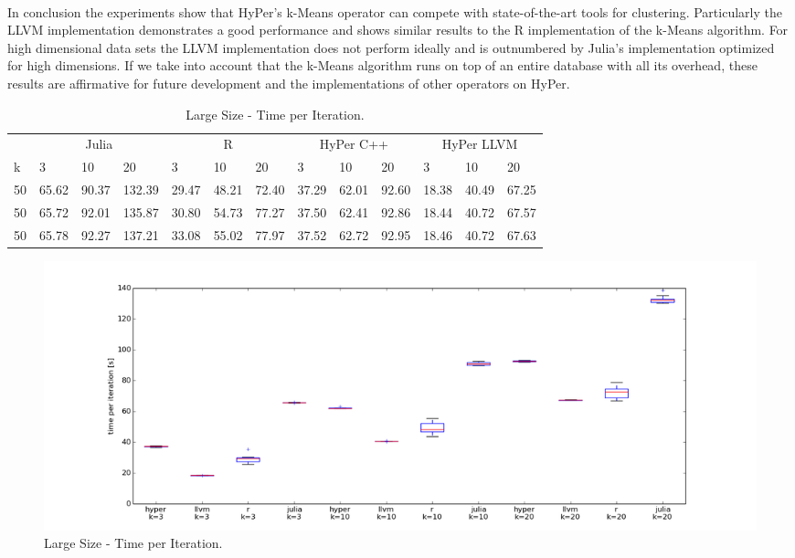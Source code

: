 \\
In conclusion the experiments show that HyPer’s k-Means operator can compete with state-of-the-art tools for clustering. Particularly the LLVM implementation demonstrates a good performance and shows similar results to the R implementation of the k-Means algorithm. For high dimensional data sets the LLVM implementation does not perform ideally and is outnumbered by Julia's implementation optimized for high dimensions. If we take into account that the k-Means algorithm runs on top of an entire database with all its overhead, these results are affirmative for future development and the implementations of other operators on HyPer. 




\begin{table}[htsb]
  \caption[Large Size - Time per Iteration]{Large Size - Time per Iteration.}
  \label{tab:150M_all}
  \centering
  \begin{tabular}{l l l l l l l l l l l l l}
    \toprule
      & \multicolumn{3}{c}{Julia} & \multicolumn{3}{c}{R} & \multicolumn{3}{c}{HyPer C++} & \multicolumn{3}{c}{HyPer LLVM}  \\
      k & 3 & 10 & 20 & 3 & 10 & 20 & 3 & 10 & 20 & 3 & 10 & 20 \\
    \midrule
      50  & 65.62 & 90.37 & 132.39 & 29.47 & 48.21 & 72.40 & 37.29 & 62.01 & 92.60 & 18.38 & 40.49 & 67.25 \\
      50  & 65.72 & 92.01 & 135.87 & 30.80 & 54.73 & 77.27 & 37.50 & 62.41 & 92.86 & 18.44 & 40.72 & 67.57 \\
      50  & 65.78 & 92.27 & 137.21 & 33.08 & 55.02 & 77.97 & 37.52 & 62.72 & 92.95 & 18.46 & 40.72 & 67.63 \\
    \bottomrule
  \end{tabular}
\end{table}





\begin{figure}[htsb]
  \raggedleft
  \includegraphics[scale=0.4, trim="0cm 1cm 0cm 0cm"]{figures/charts/150M_all}
  \caption[Large Size - Time per Iteration]{Large Size - Time per Iteration.}
  \label{fig:150M_all}
\end{figure}



